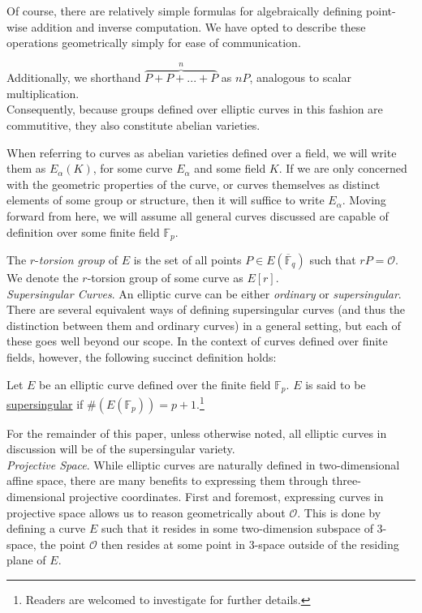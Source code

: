 Of course, there are relatively simple formulas for algebraically defining point-wise addition and inverse computation. We have opted to describe these operations geometrically simply for ease of communication.

Additionally, we shorthand $\overbrace{P + P + ... + P}^{n}$ as $nP$, analogous to scalar multiplication.\\

Consequently, because groups defined over elliptic curves in this fashion are commutitive, they also constitute abelian varieties.

When referring to curves as abelian varieties defined over a field, we will write them as $E_{\alpha}(K)$, for some curve $E_{\alpha}$ and some field $K$. If we are only concerned with the geometric properties of the curve, or curves themselves as distinct elements of some group or structure, then it will suffice to write $E_{\alpha}$. Moving forward from here, we will assume all general curves discussed are capable of definition over some finite field $\mathbb{F}_p$.

The $r$-\emph{torsion group} of $E$ is the set of all points $P \in E(\overline{\mathbb{F}}_q)$ such that $rP = \mathcal{O}$. We denote the $r$-torsion group of some curve as $E[r]$.\\

\noindent
\emph{Supersingular Curves}. An elliptic curve can be either \emph{ordinary} or \emph{supersingular}. There are several equivalent ways of defining supersingular curves (and thus the distinction between them and ordinary curves) in a general setting, but each of these goes well beyond our scope. In the context of curves defined over finite fields, however, the following succinct definition holds:
\begin{tcolorbox}
\begin{definition}
\label{defn:supersingular}
Let $E$ be an elliptic curve defined over the finite field $\mathbb{F}_{p}$. $E$ is said to be \underline{supersingular} if $\#(E(\mathbb{F}_{p})) = p+1$.\footnote{Readers are welcomed to investigate \cite{pairings} for further details.}
\end{definition}
\end{tcolorbox}

For the remainder of this paper, unless otherwise noted, all elliptic curves in discussion will be of the supersingular variety.\\

\noindent
\emph{Projective Space}\label{snip:projspace}. While elliptic curves are naturally defined in two-dimensional affine space, there are many benefits to expressing them through three-dimensional projective coordinates. First and foremost, expressing curves in projective space allows us to reason geometrically about $\mathcal{O}$. This is done by defining a curve $E$ such that it resides in some two-dimension subspace of 3-space, the point $\mathcal{O}$ then resides at some point in 3-space outside of the residing plane of $E$.

